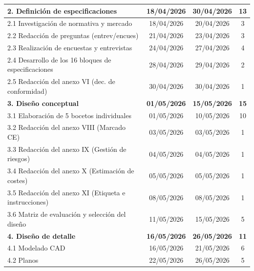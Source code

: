 \documentclass[11pt,a4paper]{article}
\begin{document}
\begin{table}[htbp]
\begin{tabularx}{\textwidth}{|>{\raggedright\arraybackslash}X|c|c|c|}
\textbf{2. Definición de especificaciones} & \textbf{18/04/2026} & \textbf{30/04/2026} & \textbf{13} \\ \hline
\hspace{0.5cm} 2.1 Investigación de normativa y mercado & 18/04/2026 & 20/04/2026 & 3 \\ \hline
\hspace{0.5cm} 2.2 Redacción de preguntas (entrev/encues) & 21/04/2026 & 23/04/2026 & 3 \\ \hline
\hspace{0.5cm} 2.3 Realización de encuestas y entrevistas & 24/04/2026 & 27/04/2026 & 4 \\ \hline
\hspace{0.5cm} 2.4 Desarrollo de los 16 bloques de especificaciones & 28/04/2026 & 29/04/2026 & 2 \\ \hline
\hspace{0.5cm} 2.5 Redacción del anexo VI (dec. de conformidad) & 30/04/2026 & 30/04/2026 & 1 \\ \hline
\textbf{3. Diseño conceptual} & \textbf{01/05/2026} & \textbf{15/05/2026} & \textbf{15} \\ \hline
\hspace{0.5cm} 3.1 Elaboración de 5 bocetos individuales & 01/05/2026 & 10/05/2026 & 10 \\ \hline
\hspace{0.5cm} 3.2 Redacción del anexo VIII (Marcado CE) & 03/05/2026 & 03/05/2026 & 1 \\ \hline
\hspace{0.5cm} 3.3 Redacción del anexo IX (Gestión de riesgos) & 04/05/2026 & 04/05/2026 & 1 \\ \hline
\hspace{0.5cm} 3.4 Redacción del anexo X (Estimación de costes) & 05/05/2026 & 05/05/2026 & 1 \\ \hline
\hspace{0.5cm} 3.5 Redacción del anexo XI (Etiqueta e instrucciones) & 08/05/2026 & 08/05/2026 & 1 \\ \hline
\hspace{0.5cm} 3.6 Matriz de evaluación y selección del diseño & 11/05/2026 & 15/05/2026 & 5 \\ \hline
\textbf{4. Diseño de detalle} & \textbf{16/05/2026} & \textbf{26/05/2026} & \textbf{11} \\ \hline
\hspace{0.5cm} 4.1 Modelado CAD & 16/05/2026 & 21/05/2026 & 6 \\ \hline
\hspace{0.5cm} 4.2 Planos & 22/05/2026 & 26/05/2026 & 5 \\ \hline

\end{tabularx}
\end{table}
\end{document}

